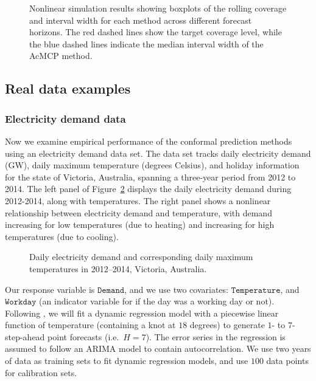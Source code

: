 \documentclass[
  11pt,
  a4paper,
]{article}
\theoremstyle{plain}
\theoremstyle{remark}
\begin{document}
\begin{figure}


\caption{\label{fig-NL_box}Nonlinear simulation results showing boxplots
of the rolling coverage and interval width for each method across
different forecast horizons. The red dashed lines show the target
coverage level, while the blue dashed lines indicate the median interval
width of the AcMCP method.}

\end{figure}%

\subsection{Real data examples}\label{real-data-examples}

\subsubsection{Electricity demand data}\label{electricity-demand-data}

Now we examine empirical performance of the conformal prediction methods
using an electricity demand data set. The data set tracks daily
electricity demand (GW), daily maximum temperature (degrees Celsius),
and holiday information for the state of Victoria, Australia, spanning a
three-year period from 2012 to 2014. The left panel of
Figure~\ref{fig-elec_data} displays the daily electricity demand during
2012-2014, along with temperatures. The right panel shows a nonlinear
relationship between electricity demand and temperature, with demand
increasing for low temperatures (due to heating) and increasing for high
temperatures (due to cooling).

\begin{figure}


\caption{\label{fig-elec_data}Daily electricity demand and corresponding
daily maximum temperatures in 2012--2014, Victoria, Australia.}

\end{figure}%

Our response variable is \(\texttt{Demand}\), and we use two covariates:
\(\texttt{Temperature}\), and \(\texttt{Workday}\) (an indicator
variable for if the day was a working day or not). Following
\textcite{hyndman2021}, we will fit a dynamic regression model with a
piecewise linear function of temperature (containing a knot at \(18\)
degrees) to generate \(1\)- to \(7\)-step-ahead point forecasts
(i.e.~\(H=7\)). The error series in the regression is assumed to follow
an ARIMA model to contain autocorrelation. We use two years of data as
training sets to fit dynamic regression models, and use \(100\) data
points for calibration sets.
\end{document}
